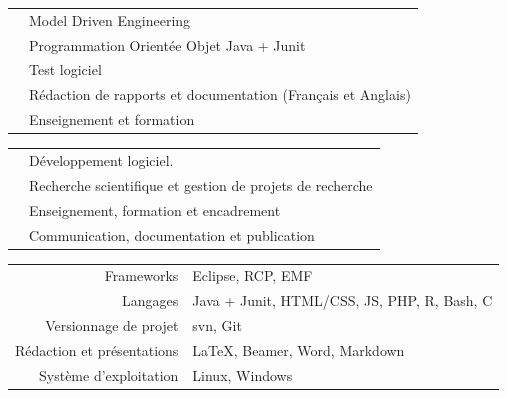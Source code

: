 \tair

\sectionline{}

\tair


\begin{tabular}{r @{~$\rangle$~} p{}}
 & Model Driven Engineering \\
 & Programmation Orientée Objet Java + Junit \\
 & Test logiciel \\
 & Rédaction de rapports et documentation (Français et Anglais) \\
 & Enseignement et formation \\
\end{tabular}

\tair


\begin{tabular}{r @{~$\rangle$~} p{}}
 & Développement logiciel. \\
 & Recherche scientifique et gestion de projets de recherche \\
 & Enseignement, formation et encadrement \\
 & Communication, documentation et publication \\
\end{tabular}

\tair


\begin{tabular}{r @{~$\rangle$~} p{}}
Frameworks & Eclipse, RCP, EMF\\
Langages & Java + Junit, HTML/CSS, JS, PHP, R, Bash, C \\
Versionnage de projet & svn, Git \\
Rédaction et présentations & LaTeX, Beamer, Word, Markdown \\
Système d’exploitation & Linux, Windows \\
\end{tabular}





